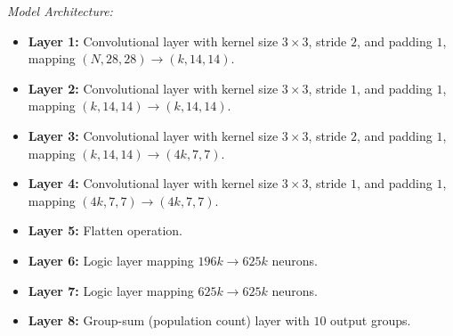 \begin{samepage}
\emph{\mnist Model Architecture:}
\begin{itemize}
    \item \textbf{Layer 1:} Convolutional layer with kernel size $3\times3$, stride $2$, and padding $1$, mapping
    $(N, 28, 28) \rightarrow (k, 14, 14)$.
    
    \item \textbf{Layer 2:} Convolutional layer with kernel size $3\times3$, stride $1$, and padding $1$, mapping
    $(k, 14, 14) \rightarrow (k, 14, 14)$.
    
    \item \textbf{Layer 3:} Convolutional layer with kernel size $3\times3$, stride $2$, and padding $1$, mapping
    $(k, 14, 14) \rightarrow (4k, 7, 7)$.
    
    \item \textbf{Layer 4:} Convolutional layer with kernel size $3\times3$, stride $1$, and padding $1$, mapping
    $(4k, 7, 7) \rightarrow (4k, 7, 7)$.
    
    \item \textbf{Layer 5:} Flatten operation.
    
    \item \textbf{Layer 6:} Logic layer mapping $196k \rightarrow 625k$ neurons.
    
    \item \textbf{Layer 7:} Logic layer mapping $625k \rightarrow 625k$ neurons.

    \item \textbf{Layer 8:} Group-sum (population count) layer with $10$ output groups.
\end{itemize}
\end{samepage}

